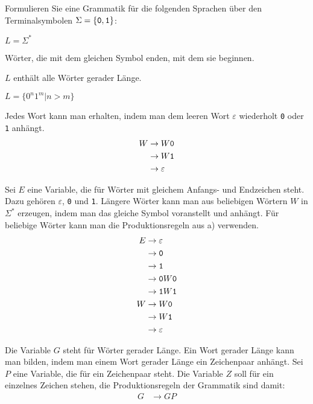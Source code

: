 Formulieren Sie eine Grammatik für die folgenden Sprachen über
den Terminalsymbolen $\Sigma=\{{\tt 0},{\tt 1}\}$:
\begin{teilaufgaben}
\item $L=\Sigma^*$
\item Wörter, die mit dem gleichen Symbol enden, mit dem sie beginnen.
\item $L$ enthält alle Wörter gerader Länge.
\item $L=\{0^n1^m|n>m\}$
\end{teilaufgaben}


\begin{loesung}
\begin{teilaufgaben}
\item
Jedes Wort kann man erhalten, indem man dem leeren Wort $\varepsilon$
wiederholt {\tt 0} oder {\tt 1} anhängt.
\begin{align*}
W&\rightarrow W{\tt 0}\\
 &\rightarrow W{\tt 1}\\
 &\rightarrow\varepsilon
\end{align*}
\item Sei $E$ eine Variable, die für Wörter mit gleichem Anfangs-
und Endzeichen steht. Dazu gehören $\varepsilon$, {\tt 0} und {\tt 1}.
Längere
Wörter kann man aus beliebigen Wörtern $W$ in $\Sigma^*$ erzeugen,
indem man das gleiche Symbol voranstellt und anhängt. Für beliebige
Wörter kann
man die Produktionsregeln aus a) verwenden.
\begin{align*}
E&\rightarrow \varepsilon\\
 &\rightarrow {\tt 0}\\
 &\rightarrow {\tt 1}\\
 &\rightarrow {\tt 0}W{\tt 0}\\
 &\rightarrow {\tt 1}W{\tt 1}\\
W&\rightarrow W{\tt 0}\\
 &\rightarrow W{\tt 1}\\
 &\rightarrow\varepsilon
\end{align*}
\item Die Variable $G$ steht für Wörter gerader Länge. Ein Wort
gerader Länge kann man bilden, indem man einem Wort gerader Länge
ein Zeichenpaar anhängt. Sei $P$ eine Variable, die für ein Zeichenpaar
steht. Die Variable $Z$ soll für ein einzelnes Zeichen stehen, die
Produktionsregeln der Grammatik sind damit:
\begin{align*}
G&\rightarrow GP\\

\end{align*}
\end{teilaufgaben}
\end{loesung}
